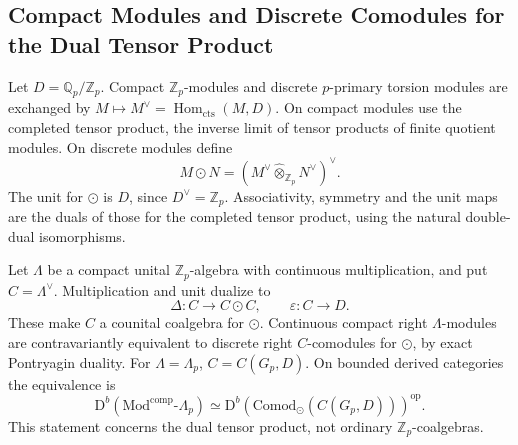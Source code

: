 \subsection{Compact Modules and Discrete Comodules for the Dual Tensor Product}
\label{v4-arith:w5-d:cts-dual:positselski-dual}

Let \(D=\mathbb Q_p/\mathbb Z_p\). Compact \(\mathbb Z_p\)-modules
and discrete \(p\)-primary torsion modules are exchanged by
\(M\mapsto M^\vee=\operatorname{Hom}_{\mathrm{cts}}(M,D)\).
On compact modules use the completed tensor product, the inverse
limit of tensor products of finite quotient modules. On discrete
modules define
\[
 M\odot N=(M^\vee\widehat\otimes_{\mathbb Z_p}N^\vee)^\vee.
\]
The unit for \(\odot\) is \(D\), since \(D^\vee=\mathbb Z_p\).
Associativity, symmetry and the unit maps are the duals of those
for the completed tensor product, using the natural double-dual
isomorphisms.

\begin{theorem}
\label{v4-arith:w5-d:cts-dual:thm:positselski}
Let \(\Lambda\) be a compact unital \(\mathbb Z_p\)-algebra with
continuous multiplication, and put \(C=\Lambda^\vee\).
Multiplication and unit dualize to
\[
 \Delta:C\longrightarrow C\odot C,
 \qquad \varepsilon:C\longrightarrow D.
\]
These make \(C\) a counital coalgebra for \(\odot\). Continuous
compact right \(\Lambda\)-modules are contravariantly equivalent
to discrete right \(C\)-comodules for \(\odot\), by exact
Pontryagin duality. For \(\Lambda=\Lambda_p\),
\(C=C(G_p,D)\). On bounded derived categories the equivalence is
\begin{equation}
\label{v4-arith:w5-d:eq:cts-positselski}
\mathrm D^b(\mathrm{Mod}^{\mathrm{comp}}\!\text{-}\Lambda_p)
 \simeq
\mathrm D^b(\mathrm{Comod}_{\odot}(C(G_p,D)))^{\mathrm{op}}.
\end{equation}
This statement concerns the dual tensor product, not ordinary
\(\mathbb Z_p\)-coalgebras.
\end{theorem}

